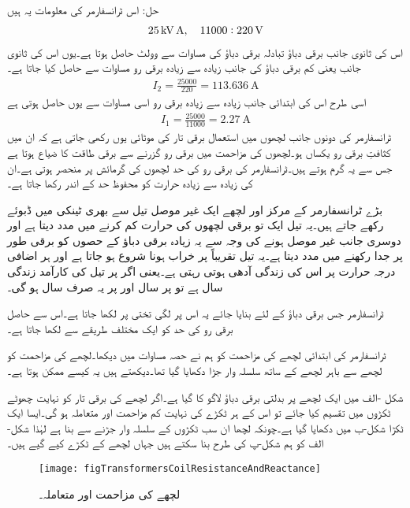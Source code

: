 حل:	اس ٹرانسفارمر کی معلومات یہ ہیں
\begin{align*}
\SI{25}{\kilo \volt \ampere}, \quad 11000:220\,\textup{V}
\end{align*}
اس کی ثانوی جانب برقی دباؤ تبادلہ برقی دباؤ کی مساوات سے   وولٹ حاصل ہوتا ہے۔یوں اس کی ثانوی جانب یعنی کم برقی دباؤ کی جانب زیادہ سے زیادہ برقی رو مساوات   سے حاصل کیا جاتا ہے۔
\begin{align*}
I_2=\frac{25000}{220}=\SI{113.636}{\ampere}
\end{align*}
اسی طرح اس کی ابتدائی جانب زیادہ سے زیادہ برقی رو اسی مساوات سے یوں حاصل ہوتی ہے
\begin{align*}
I_1=\frac{25000}{11000}=\SI{2.27}{\ampere}
\end{align*}
%
ٹرانسفارمر کی دونوں جانب لچھوں میں استعمال برقی تار کی موٹائی یوں رکھی جاتی ہے کہ ان میں کثافتِ برقی رو  یکساں ہو۔لچھوں کی مزاحمت میں برقی رو گزرنے سے برقی طاقت کا ضیاع ہوتا ہے جس سے یہ گرم ہوتے ہیں۔ٹرانسفارمر کی برقی رو کی حد لچھوں کی گرمائش پر منحصر ہوتی ہے۔ان کی زیادہ سے زیادہ حرارت کو محفوظ حد کے اندر رکھا جاتا ہے۔

بڑے ٹرانسفارمر کے مرکز اور لچھے ایک غیر موصل تیل سے بھری ٹینکی میں ڈبوئے رکھے جاتے ہیں۔یہ تیل ایک تو برقی لچھوں کی حرارت کم کرنے میں مدد دیتا ہے اور دوسری جانب غیر موصل ہونے کی وجہ سے یہ زیادہ برقی دباؤ کے حصوں کو برقی طور پر جدا رکھنے میں مدد دیتا ہے۔یہ تیل تقریباً   پر خراب ہونا شروع ہو جاتا ہے اور ہر  اضافی درجہ حرارت پر اس کی زندگی آدھی ہوتی رہتی ہے۔یعنی اگر  پر تیل کی کارآمد زندگی  سال ہے تو  پر  سال اور   پر یہ صرف   سال ہو گی۔

	ٹرانسفارمر جس برقی دباؤ کے لئے بنایا جائے  یہ اس پر لگی تختی پر لکھا جاتا ہے۔اس سے حاصل برقی رو کی حد کو ایک مختلف طریقے سے لکھا جاتا ہے۔

ٹرانسفارمر کی ابتدائی لچھے کی مزاحمت  کو ہم نے حصہ  مساوات  میں دیکھا۔لچھے کی مزاحمت کو لچھے سے باہر لچھے کے ساتھ سلسلہ وار جڑا دکھایا گیا تھا۔دیکھتے ہیں یہ کیسے ممکن ہوتا ہے۔

شکل -الف میں ایک لچھے پر بدلتی برقی دباؤ لاگو کا گیا ہے۔اگر لچھے کی برقی تار کو نہایت چھوٹے ٹکڑوں میں تقسیم کیا جائے تو اس کے ہر ٹکڑے کی نہایت کم مزاحمت  اور متعاملہ ہو گی۔ایسا ایک ٹکڑا شکل-ب میں دکھایا گیا ہے۔چونکہ لچھا ان سب ٹکڑوں کے سلسلہ وار جڑنے سے بنا ہے  لہٰذا شکل-الف کو ہم شکل-پ کی طرح بنا سکتے ہیں جہاں لچھے کے  ٹکڑے  کیے گیے ہیں۔
\begin{figure}
\centering
\texttt{[image: figTransformersCoilResistanceAndReactance]}
\caption{لچھے کی مزاحمت اور متعاملہ۔}
\label{شکل_ٹرانسفارمر_لچھے_کی_مزاحمت_اور_متعاملہ}
\end{figure}

